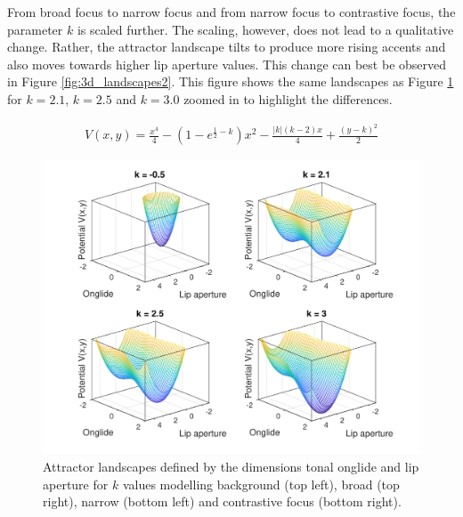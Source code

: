 From broad focus to narrow focus and from narrow focus to contrastive focus, the parameter $k$ is scaled further. The scaling, however, does not lead to a qualitative change. Rather, the attractor landscape tilts to produce more rising accents and also moves towards higher lip aperture values. This change can best be observed in Figure \ref{fig:3d_landscapes2}. This figure shows the same landscapes as Figure \ref{fig:3d_landscapes1} for $k = 2.1$, $k = 2.5$ and $k = 3.0$ zoomed in to highlight the differences.\largerpage{}

\vspace{-5mm}
\begin{equation}
\begin{split}
V(x,y) = \frac{x^4}{4} - (1-e^{\frac{1}{2}-k})x^2 - \frac{|k|(k-2)x}{4} + \frac{(y-k)^2}{2}
\label{eq:onglide_lips_model}
\end{split}
\end{equation}

\begin{figure}
\includegraphics[width=\textwidth]{figures/ch7/3d_landscapes1.pdf}
\caption[Attractor landscapes defined by the dimensions tonal onglide and lip aperture for background, broad, narrow and contrastive focus.]{Attractor landscapes defined by the dimensions tonal onglide and lip aperture for $k$ values modelling background (top left), broad (top right), narrow (bottom left) and contrastive focus (bottom right).}
\label{fig:3d_landscapes1}
\end{figure}

